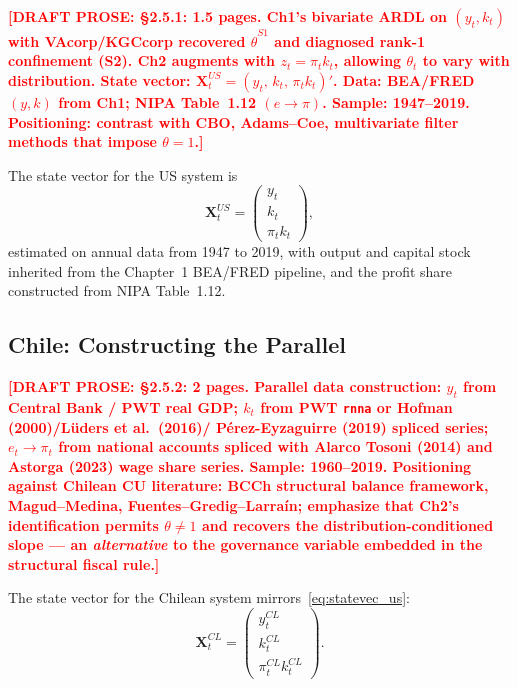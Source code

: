 \documentclass[12pt,letterpaper]{article}
\newcommand{\pit}{\pi_t}           %
\newcommand{\draftnote}[1]{%
  \textcolor{red}{\textbf{[DRAFT PROSE: #1]}}}
\begin{document}
\draftnote{§2.5.1: 1.5 pages. Ch1's bivariate ARDL on $(y_t, k_t)$ with
  VAcorp/KGCcorp recovered $\hat{\theta}^{S1}$ and diagnosed rank-1
  confinement (S2). Ch2 augments with $z_t = \pit k_t$, allowing $\theta_t$
  to vary with distribution. State vector:
  $\mathbf{X}_t^{US} = (y_t,\, k_t,\, \pit k_t)'$.
  Data: BEA/FRED $(y,k)$ from Ch1; NIPA Table~1.12 $(e \to \pi)$.
  Sample: 1947--2019. Positioning: contrast with CBO, Adams--Coe,
  multivariate filter methods that impose $\theta=1$.}

The state vector for the US system is
\begin{equation}
  \mathbf{X}_t^{US} = \begin{pmatrix} y_t \\ k_t \\ \pit k_t \end{pmatrix},
  \label{eq:statevec_us}
\end{equation}
estimated on annual data from 1947 to 2019, with output and capital stock
inherited from the Chapter~1 BEA/FRED pipeline, and the profit share
constructed from NIPA Table~1.12.


\subsection{Chile: Constructing the Parallel}
\label{sec:bridge_chile}

\draftnote{§2.5.2: 2 pages. Parallel data construction: $y_t$ from Central Bank /
  PWT real GDP; $k_t$ from PWT \texttt{rnna} or Hofman (2000)/Lüders et al.\ (2016)/
  Pérez-Eyzaguirre (2019) spliced series; $e_t \to \pi_t$ from national accounts
  spliced with Alarco Tosoni (2014) and Astorga (2023) wage share series.
  Sample: 1960--2019. Positioning against Chilean CU literature: BCCh structural
  balance framework, Magud--Medina, Fuentes--Gredig--Larraín; emphasize that
  Ch2's identification permits $\theta\neq 1$ and recovers the distribution-conditioned
  slope — an \emph{alternative} to the governance variable embedded in the
  structural fiscal rule.}

The state vector for the Chilean system mirrors~\eqref{eq:statevec_us}:
\begin{equation}
  \mathbf{X}_t^{CL} = \begin{pmatrix} y^{CL}_t \\ k^{CL}_t \\ \pi^{CL}_t k^{CL}_t \end{pmatrix}.
  \label{eq:statevec_cl}
\end{equation}
\end{document}
